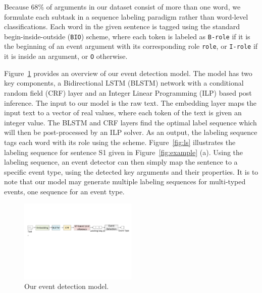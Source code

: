 Because 68\%  of  arguments in our dataset consist of more than one word, we formulate each subtask in a sequence labeling paradigm rather
than word-level classifications. Each word in the given sentence is tagged using the standard begin-inside-outside (\texttt{BIO})
scheme\FIXME{\cite{}}, where each token is labeled as \texttt{B-role} if it is the beginning of an event argument with its corresponding
role \texttt{role}, or \texttt{I-role} if it is inside an argument, or \texttt{O} otherwise.


Figure~\ref{fig:model} provides an overview of our event detection model. The model has two key components, a Bidirectional LSTM (BLSTM)
network with a conditional random field (CRF) layer and an Integer Linear Programming (ILP) based post inference. The input to our model is
the raw text. The embedding layer maps the input text to a vector of real values, where each token of the text is given an integer value.
The BLSTM and CRF layers find the optimal label sequence which will then be post-processed by an ILP solver. As an output, the labeling
sequence tags each word with its role using the \BIO scheme. Figure~\ref{fig:ls} illustrates the labeling sequence for sentence S1 given in
Figure~\ref{fig:example} (a).  Using the labeling sequence, an event detector can then simply map the sentence to a specific event type,
using the detected key arguments and their properties. It is to note that our model may generate multiple labeling sequences for
multi-typed events, one sequence for an event type.
\begin{figure}
  \centering
  \includegraphics[width=0.5\textwidth]{figs/model.pdf}
  \caption{Our event detection model.}\label{fig:model}
\end{figure}

